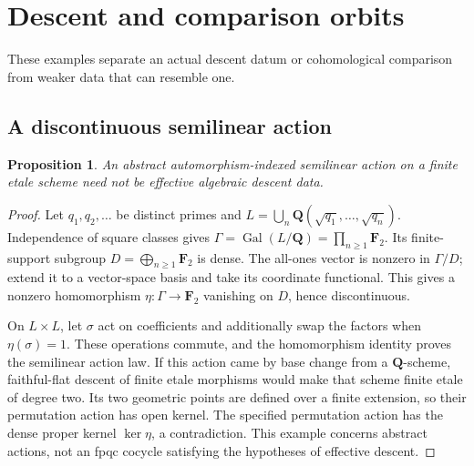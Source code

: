 \documentclass[11pt]{article}
\newtheorem{proposition}[theorem]{Proposition}
\theoremstyle{definition}\newtheorem{definition}[theorem]{Definition}
\theoremstyle{remark}\newtheorem{remark}[theorem]{Remark}
\newcommand{\Q}{\mathbf Q}\newcommand{\Z}{\mathbf Z}
\DeclareMathOperator{\Gal}{Gal}\DeclareMathOperator{\im}{im}
\begin{document}
\section{Descent and comparison orbits}\label{sec:descent-boundaries}
These examples separate an actual descent datum or cohomological comparison from weaker data that can resemble one.

\subsection{A discontinuous semilinear action}
\begin{proposition}
An abstract automorphism-indexed semilinear action on a finite etale scheme need not be effective algebraic descent data.
\end{proposition}
\begin{proof}
Let $q_1,q_2,\ldots$ be distinct primes and $L=\bigcup_n\Q(\sqrt{q_1},\ldots,\sqrt{q_n})$. Independence of square classes gives $\Gamma=\Gal(L/\Q)=\prod_{n\ge1}\mathbf F_2$. Its finite-support subgroup $D=\bigoplus_{n\ge1}\mathbf F_2$ is dense. The all-ones vector is nonzero in $\Gamma/D$; extend it to a vector-space basis and take its coordinate functional. This gives a nonzero homomorphism $\eta:\Gamma\to\mathbf F_2$ vanishing on $D$, hence discontinuous.

On $L\times L$, let $\sigma$ act on coefficients and additionally swap the factors when $\eta(\sigma)=1$. These operations commute, and the homomorphism identity proves the semilinear action law. If this action came by base change from a $\Q$-scheme, faithful-flat descent of finite etale morphisms would make that scheme finite etale of degree two. Its two geometric points are defined over a finite extension, so their permutation action has open kernel. The specified permutation action has the dense proper kernel $\ker\eta$, a contradiction. This example concerns abstract actions, not an fpqc cocycle satisfying the hypotheses of effective descent.
\end{proof}
\end{document}
